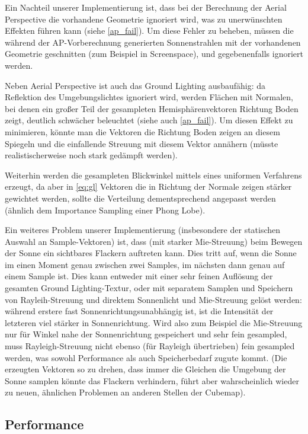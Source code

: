 Ein Nachteil unserer Implementierung ist, dass bei der Berechnung der Aerial Perspective die vorhandene Geometrie
ignoriert wird, was zu unerwünschten Effekten führen kann (siehe \cref{ap_fail}). Um diese Fehler zu beheben, müssen die
während der AP-Vorberechnung generierten Sonnenstrahlen mit der vorhandenen Geometrie geschnitten (zum Beispiel in
Screenspace), und gegebenenfalls ignoriert werden.

Neben Aerial Perspective ist auch das Ground Lighting ausbaufähig: da Reflektion des Umgebungslichtes ignoriert wird,
werden Flächen mit Normalen, bei denen ein großer Teil der gesampleten Hemisphärenvektoren Richtung Boden zeigt,
deutlich schwächer beleuchtet (siehe auch \cref{ap_fail}). Um diesen Effekt zu minimieren, könnte man die Vektoren die
Richtung Boden zeigen an diesem Spiegeln und die einfallende Streuung mit diesem Vektor annähern (müsste
realistischerweise noch stark gedämpft werden).

Weiterhin werden die gesampleten Blickwinkel mittels eines uniformen Verfahrens erzeugt, da aber in \cref{eq:gl}
Vektoren die in Richtung der Normale zeigen stärker gewichtet werden, sollte die Verteilung dementsprechend angepasst
werden (ähnlich dem Importance Sampling einer Phong Lobe).

Ein weiteres Problem unserer Implementierung (insbesondere der statischen Auswahl an Sample-Vektoren) ist, dass (mit
starker Mie-Streuung) beim Bewegen der Sonne ein sichtbares Flackern auftreten kann. Dies tritt auf, wenn die Sonne im
einen Moment genau zwischen zwei Samples, im nächsten dann genau auf einem Sample ist. Dies kann entweder mit einer sehr
feinen Auflösung der gesamten Ground Lighting-Textur, oder mit separatem Samplen und Speichern von Rayleih-Streuung und
direktem Sonnenlicht und Mie-Streuung gelöst werden: während erstere fast Sonnenrichtungsunabhängig ist, ist die
Intensität der letzteren viel stärker in Sonnenrichtung. Wird also zum Beispiel die Mie-Streuung nur für Winkel nahe der
Sonnenrichtung gespeichert und sehr fein gesampled, muss Rayleigh-Streuung nicht ebenso (für Rayleigh übertrieben) fein
gesampled werden, was sowohl Performance als auch Speicherbedarf zugute kommt. (Die erzeugten Vektoren so zu drehen,
dass immer die Gleichen die Umgebung der Sonne samplen könnte das Flackern verhindern, führt aber wahrscheinlich wieder
zu neuen, ähnlichen Problemen an anderen Stellen der Cubemap).

\subsection{Performance}

